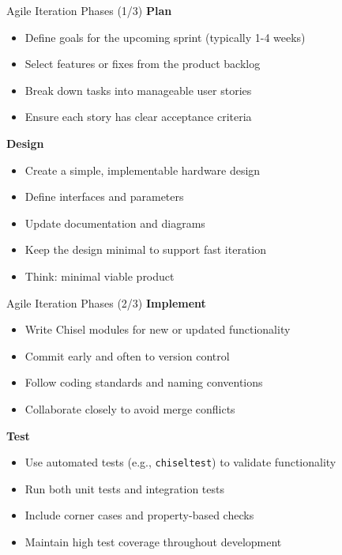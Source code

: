 \begin{frame}{Agile Iteration Phases (1/3)}
\textbf{Plan}
\begin{itemize}
    \item Define goals for the upcoming sprint (typically 1-4 weeks)
    \item Select features or fixes from the product backlog
    \item Break down tasks into manageable user stories
    \item Ensure each story has clear acceptance criteria
\end{itemize}

\medskip
\textbf{Design}
\begin{itemize}
    \item Create a simple, implementable hardware design
    \item Define interfaces and parameters
    \item Update documentation and diagrams
    \item Keep the design minimal to support fast iteration
    \item Think: minimal viable product
\end{itemize}
\end{frame}

\begin{frame}{Agile Iteration Phases (2/3)}
\textbf{Implement}
\begin{itemize}
    \item Write Chisel modules for new or updated functionality
    \item Commit early and often to version control
    \item Follow coding standards and naming conventions
    \item Collaborate closely to avoid merge conflicts
\end{itemize}

\medskip
\textbf{Test}
\begin{itemize}
    \item Use automated tests (e.g., \texttt{chiseltest}) to validate functionality
    \item Run both unit tests and integration tests
    \item Include corner cases and property-based checks
    \item Maintain high test coverage throughout development
\end{itemize}
\end{frame}

